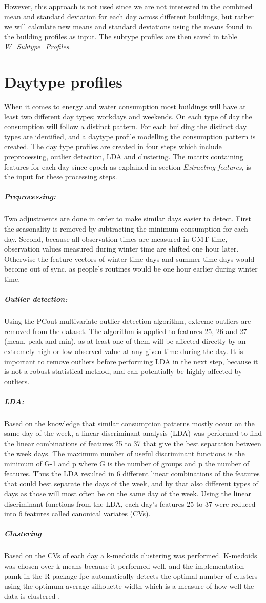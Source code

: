 However, this approach is not used since we are not interested in the combined mean and standard deviation for each day across different buildings, but rather we will calculate new means and standard deviations using the means found in the building profiles as input. The subtype profiles are then saved in table \emph{W\_Subtype\_Profiles}.
\section*{Daytype profiles}
When it comes to energy and water consumption most buildings will have at least two different day types; workdays and weekends. On each type of day the consumption will follow a distinct pattern. For each building the distinct day types are identified, and a daytype profile modelling the consumption pattern is created. The day type profiles are created in four steps which include preprocessing, outlier detection, LDA and clustering. The matrix containing features for each day since epoch as explained in section \emph{Extracting features}, is the input for these processing steps.
\subparagraph{Preprocessing:}Two adjustments are done in order to make similar days easier to detect. First the seasonality is removed by subtracting the minimum consumption for each day. Second, because all observation times are measured in GMT time, observation values measured during winter time are shifted one hour later. Otherwise the feature vectors of winter time days and summer time days would become out of sync, as people's routines would be one hour earlier during winter time. 
\subparagraph{Outlier detection:}Using the PCout multivariate outlier detection algorithm, extreme outliers are removed from the dataset. The algorithm is applied to features 25, 26 and 27 (mean, peak and min), as at least one of them will be affected directly by an extremely high or low observed value at any given time during the day. It is important to remove outliers before performing LDA in the next step, because it is not a robust statistical method, and can potentially be highly affected by outliers.
\subparagraph{LDA:} Based on the knowledge that similar consumption patterns mostly occur on the same day of the week, a linear discriminant analysis (LDA) was performed to find the linear combinations of features 25 to 37 that give the best separation between the week days. The maximum number of useful discriminant functions is the minimum of G-1 and p where G is the number of groups and p the number of features. Thus the LDA resulted in 6 different linear combinations of the features that could best separate the days of the week, and by that also different types of days as those will most often be on the same day of the week. Using the linear discriminant functions from the LDA, each day’s features 25 to 37 were reduced into 6 features called canonical variates (CVs).
\subparagraph{Clustering}Based on the CVs of each day a k-medoids clustering was performed. K-medoids was chosen over k-means because it performed well, and the implementation pamk in the R package fpc automatically detects the optimal number of clusters using the optimum average silhouette width which is a measure of how well the data is clustered \cite{PeterJRousseeuw}. 

